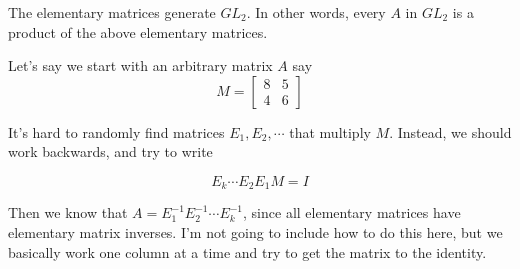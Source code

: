 \documentclass[11pt]{article}
\begin{document}
\begin{theorem}
    The elementary matrices generate $GL_2$. In other words, every $A$ in $GL_2$ is a product of the above elementary matrices.
\end{theorem}

Let's say we start with an arbitrary matrix $A$ say
\[ M = 
    \begin{bmatrix}
    8 & 5 \\
    4 & 6
    \end{bmatrix}
\]

It's hard to randomly find matrices $E_1, E_2, \cdots $ that multiply $M$. Instead, we should work backwards, and try to write 

\[
E_k \cdots E_2 E_1 M = I
\]

Then we know that $A = E_1^{-1}E_2^{-1}\cdots E_k^{-1}$, since all elementary matrices have elementary matrix inverses. I'm not going to include how to do this here, but we basically work one column at a time and try to get the matrix to the identity.
\end{document}
